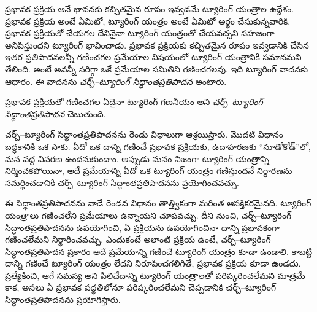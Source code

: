 \documentclass[../../../include/open-logic-section]{subfiles}
\begin{document}

ప్రభావక ప్రక్రియ అనే భావనకు కచ్చితమైన రూపం ఇవ్వడమే ట్యూరింగ్ యంత్రాల
ఉద్దేశం. ప్రభావక ప్రక్రియ అంటే ఏమిటో, ట్యూరింగ్ యంత్రం అంటే ఏమిటో అర్థం చేసుకున్నవారికి,
ప్రభావక ప్రక్రియతో చేయగల దేనినైనా ట్యూరింగ్ యంత్రంతో చేయవచ్చని సహజంగా
అనిపిస్తుందని ట్యూరింగ్ భావించాడు. ప్రభావక ప్రక్రియకు కచ్చితమైన రూపం ఇవ్వడానికి
చేసిన ఇతర ప్రతిపాదనలన్నీ గణించగల ప్రమేయాల విషయంలో ట్యూరింగ్ యంత్రానికి
సమానమని తేలింది. అంటే అవన్నీ సరిగ్గా ఒకే ప్రమేయాల సమితిని గణించగలవు.
ఇది ట్యూరింగ్ వాదనకు ఆధారం. ఈ వాదనను
\emph{చర్చ్--ట్యూరింగ్ సిద్ధాంతప్రతిపాదన} అంటారు.

\begin{defn}[చర్చ్--ట్యూరింగ్ సిద్ధాంతప్రతిపాదన]
ప్రభావక ప్రక్రియతో గణించగల ఏదైనా ట్యూరింగ్-గణనీయం అని
\emph{చర్చ్--ట్యూరింగ్ సిద్ధాంతప్రతిపాదన} చెబుతుంది.
\end{defn}

చర్చ్--ట్యూరింగ్ సిద్ధాంతప్రతిపాదనను రెండు విధాలుగా ఆశ్రయిస్తారు. మొదటి విధానం బద్ధకానికి ఒక సాకు. ఏదో ఒక దాన్ని గణించే ప్రభావక ప్రక్రియకు, ఉదాహరణకు
``సూడోకోడ్''లో, మన వద్ద వివరణ ఉందనుకుందాం. అప్పుడు మనం నిజంగా ట్యూరింగ్
యంత్రాన్ని నిర్మించకపోయినా, అదే ప్రమేయాన్ని ఏదో ఒక ట్యూరింగ్ యంత్రం గణిస్తుందనే
నిర్ధారణను సమర్థించడానికి చర్చ్--ట్యూరింగ్ సిద్ధాంతప్రతిపాదనను ప్రయోగించవచ్చు.

ఈ సిద్ధాంతప్రతిపాదనను వాడే రెండవ విధానం తాత్త్వికంగా మరింత
ఆసక్తికరమైనది. ట్యూరింగ్ యంత్రాలు గణించలేని ప్రమేయాలు ఉన్నాయని చూపవచ్చు.
దీని నుంచి, చర్చ్--ట్యూరింగ్ సిద్ధాంతప్రతిపాదనను ఉపయోగించి, ఏ ప్రక్రియను
ఉపయోగించినా దాన్ని ప్రభావకంగా గణించలేమని నిర్ధారించవచ్చు. ఎందుకంటే అలాంటి
ప్రక్రియ ఉంటే, చర్చ్--ట్యూరింగ్ సిద్ధాంతప్రతిపాదన ప్రకారం అదే ప్రమేయాన్ని గణించే ట్యూరింగ్
యంత్రం కూడా ఉండాలి. కాబట్టి దాన్ని గణించే ట్యూరింగ్ యంత్రం లేదని
నిరూపించగలిగితే, ప్రభావక ప్రక్రియ కూడా ఉండదు. ప్రత్యేకించి, ఆగే సమస్య అని
పిలిచేదాన్ని ట్యూరింగ్ యంత్రాలతో పరిష్కరించలేమని మాత్రమే కాక, అసలు ఏ
ప్రభావక పద్ధతిలోనూ పరిష్కరించలేమని చెప్పడానికి చర్చ్--ట్యూరింగ్
సిద్ధాంతప్రతిపాదనను ప్రయోగిస్తారు.
\end{document}
